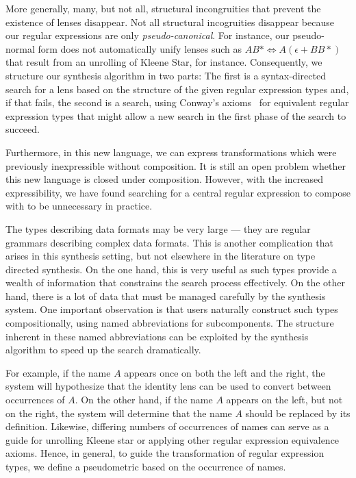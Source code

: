 \documentclass[numbers]{sigplanconf}
\begin{document}
More generally, many, but not all, structural incongruities that
prevent the existence of lenses disappear.
Not all structural incogruities disappear because our regular expressions
are only \emph{pseudo-canonical}.  For instance, our pseudo-normal form
does not automatically unify lenses such as
$A B* \Leftrightarrow A (\epsilon + BB*)$ that result from an
unrolling of Kleene Star, for instance.
Consequently, we structure our synthesis algorithm in two parts:  The
first is a syntax-directed search for a lens based on the structure of the given
regular expression types and, if that fails, the second is a search,
using Conway's axioms~\cite{conway} for 
equivalent regular expression types that might allow a new search
in the first phase of the search to succeed.

Furthermore, in this new language, we can express transformations which were
previously inexpressible without composition.  It is still an open problem
whether this new language is closed under composition.  However, with the
increased expressibility, we have found searching for a central regular
expression to compose with to be unnecessary in practice.

The types
describing data formats may be very large --- they are regular
grammars describing complex data formats.  This is another complication that
arises in this synthesis setting, but not elsewhere in the literature on type
directed synthesis.  On the one hand, this is
very useful as such types provide a wealth of information that constrains
the search process effectively.  On the other hand, there is a lot of
data that must be managed carefully by the synthesis system.
One important observation is that users naturally construct
such types compositionally, using named abbreviations for subcomponents.
The structure inherent in these named abbreviations can be 
exploited by the synthesis algorithm to speed up the search dramatically.

For example, if the name $A$ appears once on both the left and the right,
the system will hypothesize that the identity lens can be used to convert
between occurrences of $A$.  On the other hand, if the name $A$ appears
on the left, but not on the right, the system will determine that the
name $A$ should be replaced by its definition.  Likewise, differing
numbers of occurrences of names can serve as a guide for unrolling
Kleene star or applying other regular expression equivalence axioms.
Hence, in general, to guide the transformation of regular expression
types, we define a pseudometric based on the occurrence of names.
\end{document}
